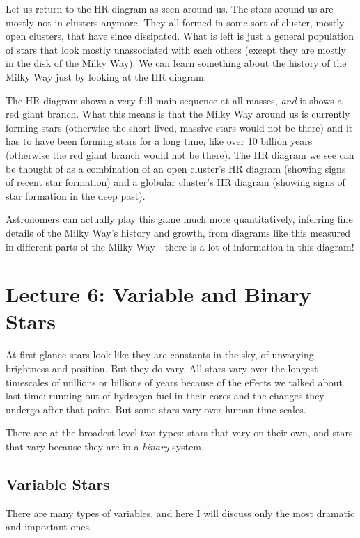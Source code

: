 \documentclass[12pt, preprint]{aastex}
\begin{document}
Let us return to the HR diagram as seen around us. The stars around us
are mostly not in clusters anymore. They all formed in some sort of
cluster, mostly open clusters, that have since dissipated. What is
left is just a general population of stars that look mostly
unassociated with each others (except they are mostly in the disk of
the Milky Way). We can learn something about the history of the Milky
Way just by looking at the HR diagram.

The HR diagram shows a very full main sequence at all masses, {\it
  and} it shows a red giant branch. What this means is that the Milky
Way around us is currently forming stars (otherwise the short-lived,
massive stars would not be there) and it has to have been forming
stars for a long time, like over 10 billion years (otherwise the red
giant branch would not be there). The HR diagram we see can be thought
of as a combination of an open cluster's HR diagram (showing signs of
recent star formation) and a globular cluster's HR diagram (showing
signs of star formation in the deep past).

Astronomers can actually play this game much more quantitatively,
inferring fine details of the Milky Way's history and growth, from
diagrams like this measured in different parts of the Milky
Way---there is a lot of information in this diagram!

\clearpage
\section{Lecture 6: Variable and Binary Stars}

At first glance stars look like they are constants in the sky, of
unvarying brightness and position. But they do vary. All stars vary
over the longest timescales of millions or billions of years because
of the effects we talked about last time: running out of hydrogen fuel
in their cores and the changes they undergo after that point. But some
stars vary over human time scales.

There are at the broadest level two types: stars that vary on their
own, and stars that vary because they are in a {\it binary} system.

\subsection{Variable Stars}

There are many types of variables, and here I will discuss only the
most dramatic and important ones.
\end{document}
